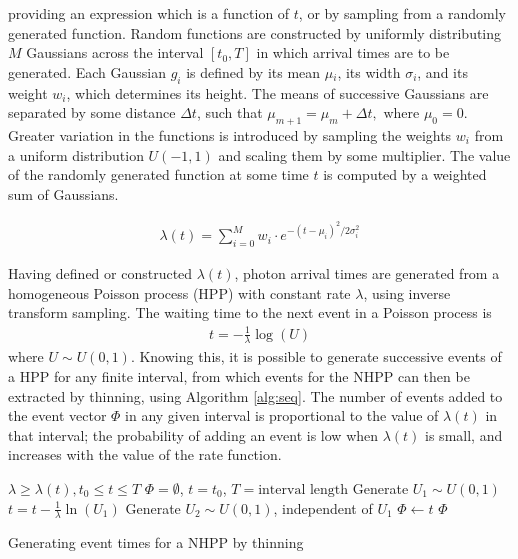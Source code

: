 \documentclass[11pt]{article}
\begin{document}
  providing an expression which is a function of $t$, or by sampling from a
  randomly generated function. Random functions are constructed by uniformly
  distributing $M$ Gaussians across the interval $\left[t_0,T\right]$ in which
  arrival times are to be generated. Each Gaussian $g_i$ is defined by its mean
  $\mu$$_i$, its width $\sigma$$_i$, and its weight $w_i$, which determines its
  height. The means of successive Gaussians are separated by some distance
  $\Delta t$, such that $\mu_{m+1}=\mu_m + \Delta t,\text{ where }
  \mu_0=0$. Greater variation in the functions is introduced by sampling the
  weights $w_i$ from a uniform distribution $U(-1,1)$ and scaling them by some
  multiplier. The value of the randomly generated function at some time $t$ is
  computed by a weighted sum of Gaussians.

  \begin{align}
  \lambda(t) = \sum_{i=0}^M w_i\cdot e^{-(t-\mu_i)^2/2\sigma_i^2}
  \end{align}

  Having defined or constructed $\lambda(t)$, photon arrival times are generated
  from a homogeneous Poisson process (HPP) with constant rate $\lambda$, using
  inverse transform sampling. The waiting time to the next event in a Poisson
  process is \cite{1998art}
  \begin{align}\label{eq:homlambda}
  t=-\frac{1}{\lambda}\log(U)
  \end{align} where $U\sim U(0,1)$. Knowing this, it is possible to generate
  successive events of a HPP for any finite interval, from which events for the
  NHPP can then be extracted by thinning, using Algorithm \ref{alg:seq}. The
  number of events added to the event vector $\Phi$ in any given interval is
  proportional to the value of $\lambda(t)$ in that interval; the probability of
  adding an event is low when $\lambda(t)$ is small, and increases with the
  value of the rate function.

  \begin{algorithm}[H]
  \begin{algorithmic}[1]
  \REQUIRE $\lambda\geq \lambda(t), t_0 \leq t \leq T$
  \STATE $\Phi=\emptyset$, $t=t_0$, $T=\text{interval length}$
  \STATE Generate $U_1\sim U(0,1)$
  \STATE $t=t-\frac{1}{\lambda}\ln(U_1)$
  \STATE Generate $U_2\sim U(0,1)$, independent of $U_1$
  \STATE $\Phi \leftarrow t$
  \ENDIF
  \ENDWHILE
  \RETURN $\Phi$
  \end{algorithmic}
  \caption{Generating event times for a NHPP by thinning}
  \label{alg:seq}
  \end{algorithm}
\end{document}

